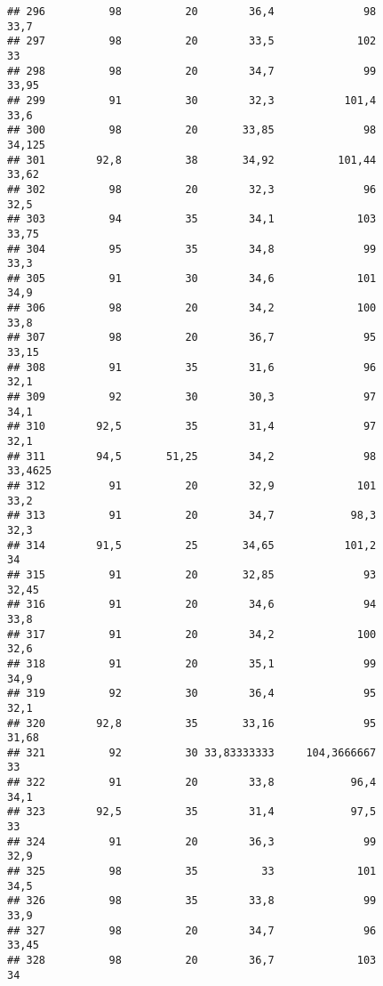 \documentclass[
]{article}
\begin{document}
\begin{verbatim}
## 296          98          20        36,4              98                 33,7
## 297          98          20        33,5             102                   33
## 298          98          20        34,7              99                33,95
## 299          91          30        32,3           101,4                 33,6
## 300          98          20       33,85              98               34,125
## 301        92,8          38       34,92          101,44                33,62
## 302          98          20        32,3              96                 32,5
## 303          94          35        34,1             103                33,75
## 304          95          35        34,8              99                 33,3
## 305          91          30        34,6             101                 34,9
## 306          98          20        34,2             100                 33,8
## 307          98          20        36,7              95                33,15
## 308          91          35        31,6              96                 32,1
## 309          92          30        30,3              97                 34,1
## 310        92,5          35        31,4              97                 32,1
## 311        94,5       51,25        34,2              98              33,4625
## 312          91          20        32,9             101                 33,2
## 313          91          20        34,7            98,3                 32,3
## 314        91,5          25       34,65           101,2                   34
## 315          91          20       32,85              93                32,45
## 316          91          20        34,6              94                 33,8
## 317          91          20        34,2             100                 32,6
## 318          91          20        35,1              99                 34,9
## 319          92          30        36,4              95                 32,1
## 320        92,8          35       33,16              95                31,68
## 321          92          30 33,83333333     104,3666667                   33
## 322          91          20        33,8            96,4                 34,1
## 323        92,5          35        31,4            97,5                   33
## 324          91          20        36,3              99                 32,9
## 325          98          35          33             101                 34,5
## 326          98          35        33,8              99                 33,9
## 327          98          20        34,7              96                33,45
## 328          98          20        36,7             103                   34

\end{verbatim}
\end{document}
